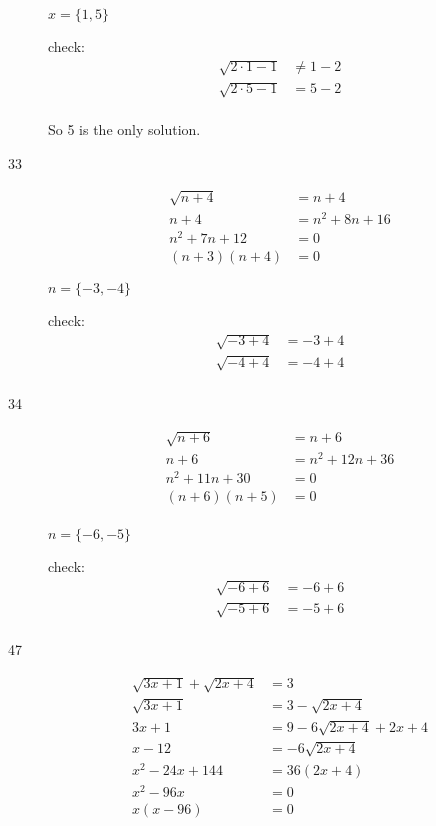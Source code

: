 \documentclass[fleqn,addpoints]{exam}
\begin{document}
\begin{description}
$x = \{1, 5\}$

check:
\begin{align*}
  \sqrt{2 \cdot 1-1} &\neq 1-2 \\
  \sqrt{2 \cdot 5-1} &= 5-2 \\
\end{align*}

So 5 is the only solution.

\item[33]
\begin{align*}
  \sqrt{n+4} &= n+4 \\
  n+4 &= n^2 + 8n + 16 \\
  n^2+7n+12 &= 0 \\
  (n+3)(n+4) &= 0
\end{align*}

$n = \{-3, -4\}$

check:
\begin{align*}
  \sqrt{-3+4} &= -3+4 \\
  \sqrt{-4+4} &= -4+4 \\
\end{align*}

\item[34]
\begin{align*}
  \sqrt{n+6} &= n+6 \\
  n+6 &= n^2 + 12n + 36 \\
  n^2 + 11n + 30 &= 0 \\
  (n+6)(n+5) &= 0 \\  
\end{align*}

$n = \{-6, -5\}$

check:
\begin{align*}
  \sqrt{-6+6} &= -6+6 \\
  \sqrt{-5+6} &= -5+6 \\
\end{align*}

\item[47]
\begin{align*}
  \sqrt{3x+1} + \sqrt{2x+4} &= 3 \\
  \sqrt{3x+1} &= 3 - \sqrt{2x+4} \\
  3x+1 &= 9 - 6\sqrt{2x+4} + 2x + 4 \\
  x-12 &= -6\sqrt{2x+4} \\
  x^2-24x+144 &= 36(2x+4) \\
  x^2-96x &= 0 \\
  x(x-96) &= 0 \\
\end{align*}


\end{description}
\end{document}
